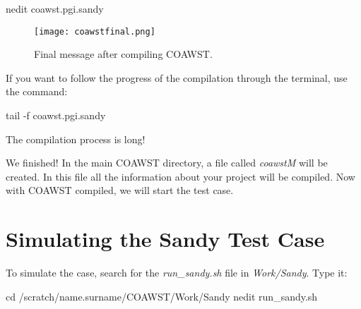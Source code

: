\begin{bashcode}
nedit coawst.pgi.sandy
\end{bashcode}
\bigskip

\begin{figure}[H]
    \centering
    \texttt{[image: coawstfinal.png]}
    \caption{Final message after compiling COAWST.}
    \label{compcoafinal}
\end{figure}
\bigskip

\noindent If you want to follow the progress of the compilation through the terminal, use the command:
\bigskip

\begin{bashcode}
tail -f coawst.pgi.sandy
\end{bashcode}
\bigskip

\begin{tcolorbox}[enhanced,
  grow to left by=0cm,%
  grow to right by=0cm,%
  enlarge top by=0cm,%
  enlarge bottom by=0cm,%
  tcbox raise base,
  boxrule=1.0pt,
  left=18mm,
  colframe=red!50!black,coltext=red!25!black,colback=red!10!white,
  overlay={\begin{tcbclipinterior}\fill[red!75!blue!50!white] (frame.south west)
    rectangle node[text=white,font=\sffamily\bfseries\footnotesize,rotate=0] {WARNING} ([xshift=18mm]frame.north west);\end{tcbclipinterior}}]
The compilation process is long!
\end{tcolorbox}
\bigskip


\noindent We finished! In the main COAWST directory, a file called \textit{coawstM} will be created. In this file all the information about your project 
will be compiled. Now with COAWST compiled, we will start the test case.
\bigskip

\section{Simulating the Sandy Test Case}\label{sandyexec}
\bigskip

\noindent To simulate the case, search for the \textit{run\_sandy.sh} file in \textit{Work/Sandy}. Type it:
\bigskip

\begin{bashcode}
cd /scratch/name.surname/COAWST/Work/Sandy
nedit run_sandy.sh
\end{bashcode}
\bigskip

